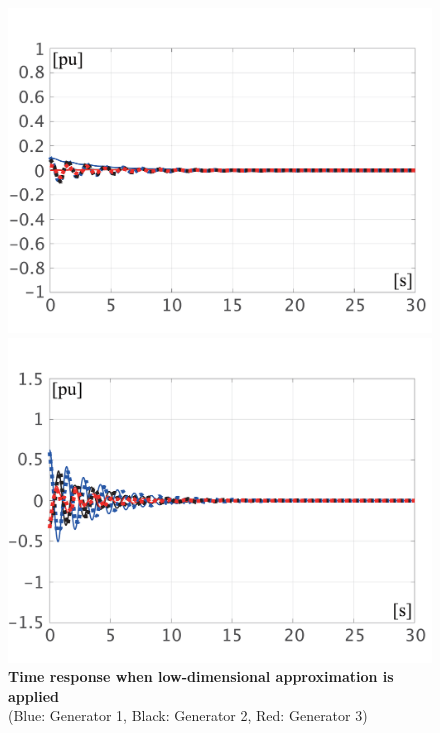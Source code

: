 \documentclass[tombow,dvipdfmx]{corona-a5-1.1}
\begin{document}
\begin{figure}[t]
{ \begin{minipage}{0.49\linewidth}
    \centering
    \includegraphics[width = 1.0\linewidth]{figs/Espa}
    \medskip
  \end{minipage}
  \begin{minipage}{0.49\linewidth}
    \centering
    \includegraphics[width = 1.0\linewidth]{figs/Pspa}
    \medskip
  \end{minipage}
  }
  \medskip
  \caption{\textbf{Time response when low-dimensional approximation is applied}
  \\  \centering(Blue: Generator 1, Black: Generator 2, Red: Generator 3)}
  \label{fig:timeexsp}
\medskip
\end{figure}
\end{document}
